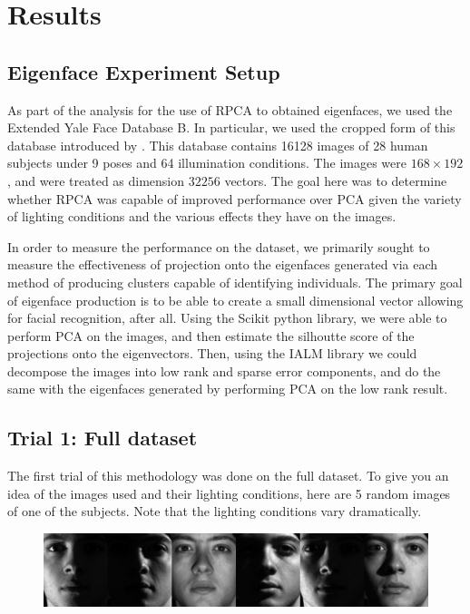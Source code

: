 \documentclass[11pt]{scrartcl} %
\theoremstyle{plain}
\begin{document}
\section{Results}

\subsection{Eigenface Experiment Setup}

As part of the analysis for the use of RPCA to obtained eigenfaces, we used the Extended Yale Face Database B\cite{yaleb}. In particular, we used the cropped form of this database introduced by \cite{croppedyaleb}. This database contains 16128 images of 28 human subjects under 9 poses and 64 illumination conditions. The images were $168 \times 192$, and were treated as dimension $32256$ vectors. The goal here was to determine whether RPCA was capable of improved performance over PCA given the variety of lighting conditions and the various effects they have on the images.

In order to measure the performance on the dataset, we primarily sought to measure the effectiveness of projection onto the eigenfaces generated via each method of producing clusters capable of identifying individuals. The primary goal of eigenface production is to be able to create a small dimensional vector allowing for facial recognition, after all. Using the Scikit \cite{scikit} python library, we were able to perform PCA on the images, and then estimate the silhoutte score of the projections onto the eigenvectors. Then, using the IALM library\cite{usedcode} we could decompose the images into low rank and sparse error components, and do the same with the eigenfaces generated by performing PCA on the low rank result.

\subsection{Trial 1: Full dataset}

The first trial of this methodology was done on the full dataset. To give you an idea of the images used and their lighting conditions, here are 5 random images of one of the subjects. Note that the lighting conditions vary dramatically.

\begin{figure}[H]
\includegraphics[width=\textwidth]{figures/person24trial1.jpg} 
\centering
\end{figure}
\end{document}
